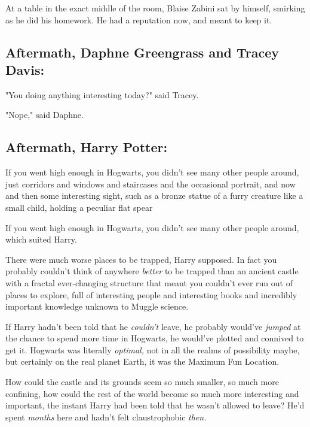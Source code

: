 At a table in the exact middle of the room, Blaise Zabini sat by himself,
smirking as he did his homework. He had a reputation now, and meant to keep it.
\sbreak
\vspace{-2\baselineskip}
\subsection{Aftermath, Daphne Greengrass and Tracey Davis:}

"You doing anything interesting today?" said Tracey.

"Nope," said Daphne.
\sbreak
\vspace{-2\baselineskip}
\subsection{Aftermath, Harry Potter:}

If you went high enough in Hogwarts, you didn't see many other people around,
just corridors and windows and staircases and the occasional portrait, and now
and then some interesting sight, such as a bronze statue of a furry creature
like a small child, holding a peculiar flat spear{\el}

If you went high enough in Hogwarts, you didn't see many other people around,
which suited Harry.

There were much worse places to be trapped, Harry supposed. In fact you
probably couldn't think of anywhere \emph{better} to be trapped than an ancient
castle with a fractal ever-changing structure that meant you couldn't ever run
out of places to explore, full of interesting people and interesting books and
incredibly important knowledge unknown to Muggle science.

If Harry hadn't been told that he \emph{couldn't} leave, he probably would've
\emph{jumped} at the chance to spend more time in Hogwarts, he would've plotted
and connived to get it. Hogwarts was literally \emph{optimal,} not in all the
realms of possibility maybe, but certainly on the real planet Earth, it was the
Maximum Fun Location.

How could the castle and its grounds seem so much smaller, so much more
confining, how could the rest of the world become so much more interesting and
important, the instant Harry had been told that he wasn't allowed to leave?
He'd spent \emph{months} here and hadn't felt claustrophobic \emph{then.}

